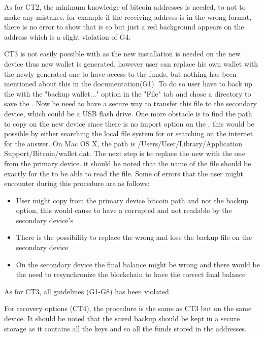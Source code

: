 As for CT2, the minimum knowledge of bitcoin addresses is needed, to not to make any mistakes. for example if the receiving address is in the wrong format, there is no error to show that is so but just a red background appears on the address which is a slight violation of G4. \

CT3 is not easily possible with \bitcoinclient as the new installation is needed on the new device thus new wallet is generated, however user can replace his own wallet with the newly generated one to have access to the funds, but nothing has been mentioned about this in the documentation(G1).  To do so user have to back up the \walletfile with the "backup wallet..." option in the "File" tab and chose a directory to save the \walletfile. Now he need to have a secure way to transfer this file to the secondary device, which could be a USB flash drive. One more obstacle is to find the path to copy \walletfile on the new device since there is no import option on the \bitcoinclient, this would be possible by either searching the local file system for \walletfile or searching on the internet for the answer. On Mac OS X, the path is /Users/User/Library/Application Support/Bitcoin/wallet.dat. The next step is to replace the new \walletfile with the one from the primary device. it should be noted that the name of the file should be exactly \walletfile for the \bitcoinclient to be able to read the file. Some of errors that the user might encounter during this procedure are as follows:
\begin{itemize}
	\item User might copy \walletfile from the primary device bitcoin path and not the backup option, this would cause to have a corrupted \walletfile and not readable by the secondary device's \bitcoinclient
	\item There is the possibility to replace the wrong \walletfile and lose the backup file on the secondary device	
	\item On the secondary device the final balance might be wrong and there would be the need to resynchronize the blockchain to have the correct final balance
\end{itemize}
As for CT3, all guidelines (G1-G8) has been violated.\

For recovery options (CT4), the procedure is the same as CT3 but on the same device. It should be noted that the saved backup \walletfile should be kept in a secure storage as it contains all the keys and so all the funds stored in the addresses.

